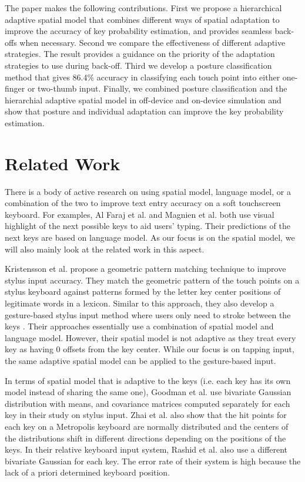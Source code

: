 \documentclass{sigchi}
\begin{document}
The paper makes the following contributions. First
we propose a hierarchical adaptive spatial model that combines different
ways of spatial adaptation to improve the accuracy of key probability estimation, and provides seamless back-offs when necessary.
Second we compare the effectiveness of different adaptive strategies.
The result provides a guidance on the priority of the adaptation strategies to use during 
back-off. Third we develop a posture classification method that gives 86.4\% accuracy in
classifying each touch point into either one-finger or two-thumb input. Finally, we 
combined posture classification and the hierarchial adaptive spatial model in off-device and 
on-device simulation and show that posture and individual adaptation can improve the key probability estimation.

\section{Related Work}
There is a body of active research on using spatial model, language model, or a combination
of the two to improve text entry accuracy on a soft touchscreen keyboard. For examples, 
Al Faraj et al. \cite{AlFaraj:2009} and Magnien et al. \cite{Magnien:2004} both use
visual highlight of the next possible keys to aid users' typing. Their predictions of the next keys are
based on language model. As our focus is on the 
spatial model, we will also mainly look at the related work in this aspect.    

Kristensson et al. \cite{Kristensson:2005} propose a geometric pattern matching technique to improve 
stylus input accuracy. They match the geometric pattern of the touch points on a stylus keyboard against patterns formed by 
the letter key center positions of legitimate words in a lexicon. Similar to this approach,
they also develop a gesture-based stylus input method where users only need to stroke between the keys \cite{Kristensson:2004}.
Their approaches essentially use a combination of spatial model and language model. However, 
their spatial model is not adaptive as they treat every key as having 0 offsets from 
the key center. While our focus is on tapping input, the same adaptive spatial model
can be applied to the gesture-based input.

In terms of spatial model that is adaptive to the keys (i.e. each key has its own model instead of
sharing the same one), Goodman et al. \cite{Goodman:2002} use bivariate Gaussian distribution with means, and
covariance matrices computed separately for each key in their study on stylus input. Zhai et al. \cite{Zhai:2002} also show that
the hit points for each key on a Metropolis keyboard \cite{Zhai:2000} are normally distributed and 
the centers of the distributions shift in different directions depending on the positions of
the keys. In their relative keyboard input system, Rashid et al. \cite{Rashid:2008} also use a different bivariate
Gaussian for each key. The error rate of their system is high because the lack of 
a priori determined keyboard position.
\end{document}
